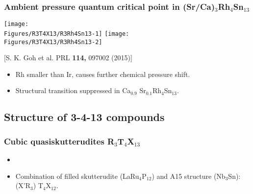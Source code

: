\begin{frame}[label=CIS-4]
\frametitle{Ambient pressure quantum critical point in (Sr/Ca)$_3$Rh$_4$Sn$_{13}$}


\texttt{[image: \\Figures/R3T4X13/R3Rh4Sn13-1]}
\hfill
\texttt{[image: \\Figures/R3T4X13/R3Rh4Sn13-2]}

\centerline{\small [S. K. Goh et al. PRL {\bf 114,} 097002 (2015)]}
\begin{itemize}
\item
Rh smaller than Ir, causes further chemical pressure shift.

\item
Structural transition suppressed in Ca$_{0.9}$ Sr$_{0.1}$Rh$_4$Sn$_{13}$.

\end{itemize}
\end{frame}


\subsection{Structure of 3-4-13 compounds}
\begin{frame}[label=CIS-0]
\frametitle{Cubic quasiskutterudites R$_3$T$_4$X$_{13}$}

\centerline {}
\begin{itemize}
\item %

\item %
{Combination of
  filled skutterudite (LaRu$_4$P$_{12}$) and A15 structure (Nb$_3$Sn):
  (X'R$_3$) T$_4$X$_{12}$. }
\end{itemize}
\end{frame}

